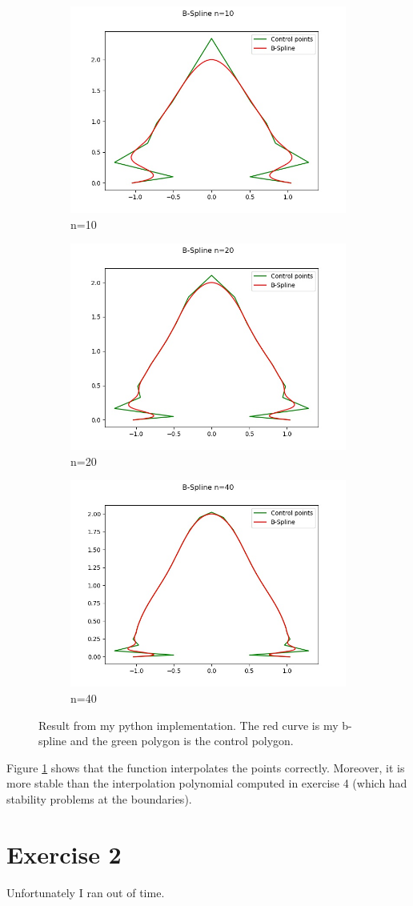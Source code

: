 \documentclass[12pt]{article}
\begin{document}
\begin{figure}[H]
\centering
\begin{subfigure}{.5\textwidth}
  \centering
	\includegraphics[width=0.7\columnwidth]{result10.jpg}
	\caption{n=10}
\end{subfigure}%
\begin{subfigure}{.5\textwidth}
 \centering
	\includegraphics[width=0.7\columnwidth]{result20.jpg}
	\caption{n=20}
\end{subfigure}
\begin{subfigure}{.5\textwidth}
 \centering
	\includegraphics[width=0.7\columnwidth]{result40.jpg}
	\caption{n=40}
\end{subfigure}
\caption{Result from my python implementation. The red curve is my b-spline and the green polygon is the control polygon.}
\label{fig:result}

\end{figure}


Figure \ref{fig:result} shows that the function interpolates the points correctly. Moreover, it is more stable than the interpolation polynomial computed in exercise 4 (which had stability problems at the boundaries). \\

\section*{Exercise 2}
Unfortunately I ran out of time.
\end{document}
